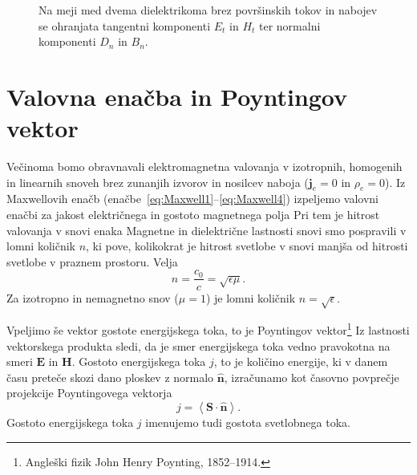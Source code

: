\begin{figure}[h]
\centering
  \def\svgwidth{75truemm} 
  
\caption{Na meji med dvema dielektrikoma brez površinskih tokov
in nabojev se ohranjata tangentni komponenti $E_t$ in $H_t$ ter 
normalni komponenti $D_n$ in $B_n$.}
\label{fig:Robni-pogoji}
\end{figure}

\section{Valovna enačba in Poyntingov vektor}
Večinoma bomo obravnavali elektromagnetna valovanja v izotropnih, 
homogenih in linearnih snoveh brez zunanjih izvorov in
nosilcev naboja ($\mathbf{j}_e=0$ in $\rho_{e}=0$). 
Iz Maxwellovih enačb (enačbe~\ref{eq:Maxwell1}--\ref{eq:Maxwell4}) izpeljemo valovni 
enačbi za jakost električnega in gostoto magnetnega polja 
Pri tem je hitrost valovanja v snovi enaka 
Magnetne in dielektrične lastnosti snovi smo pospravili
v lomni količnik $n$, ki pove, kolikokrat je hitrost 
svetlobe v snovi manjša od hitrosti svetlobe v praznem prostoru. Velja
\begin{equation}
n=\frac{c_{0}}{c}=\sqrt{\epsilon\mu}.
\end{equation}
Za izotropno in nemagnetno snov ($\mu=1$) je lomni količnik $n=\sqrt{\epsilon}$.

Vpeljimo še vektor gostote energijskega toka, to je Poyntingov 
vektor\footnote{Angleški fizik John Henry Poynting, 1852--1914.} 
Iz lastnosti vektorskega produkta sledi, da je smer energijskega toka vedno pravokotna na 
smeri $\mathbf{E}$ in $\mathbf{H}$. Gostoto energijskega toka $j$, to je količino
energije, ki v danem času preteče skozi dano ploskev
z normalo $\mathbf{\hat{n}}$, izračunamo kot časovno povprečje projekcije
Poyntingovega vektorja 
\begin{equation}
j=\left\langle \mathbf{\mathbf{S}}\cdot\mathbf{\hat{n}}\right\rangle.
\end{equation}
Gostoto energijskega toka $j$ imenujemo tudi gostota svetlobnega 
toka.

